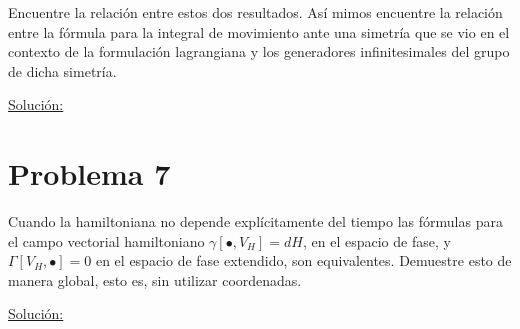 \documentclass[a4paper,10pt]{article}
\numberwithin{equation}{section}
\begin{document}
\vspace{.3cm}

Encuentre la relación entre estos dos resultados. Así mimos encuentre la relación 
entre la fórmula para la integral de movimiento ante una simetría que se vio en el 
contexto de la formulación lagrangiana y los generadores infinitesimales del grupo 
de dicha simetría.

\vspace{.3cm}

\underline{Solución:} \vspace{.3cm}

\section{Problema 7}

Cuando la hamiltoniana no depende explícitamente del tiempo las fórmulas para el 
campo vectorial hamiltoniano $\gamma[\bullet,V_H] = dH$, en el espacio de fase, 
y $\Gamma[V_H,\bullet] = 0$ en el espacio de fase extendido, son equivalentes. 
Demuestre esto de manera global, esto es, sin utilizar coordenadas.

\vspace{.3cm}

\underline{Solución:} \vspace{.3cm}
\end{document}
